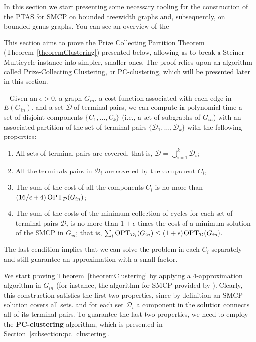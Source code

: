 In this section we start presenting some necessary tooling for the construction of the PTAS for SMCP on bounded treewidth graphs and, subsequently, on bounded genus graphs. You can see an overview of the 

This section aims to prove the Prize Collecting Partition Theorem (Theorem~\ref{theoremClustering}) presented below, allowing us to break a Steiner Multicycle instance into simpler, smaller ones. The proof relies upon an algorithm called Prize-Collecting Clustering, or PC-clustering, which will be presented later in this section.

\begin{ftheo}~\label{theoremClustering}
Given an \(\epsilon > 0\), a graph \(G_{in}\), a cost function associated with each edge in \(E(G_{in})\), and a set \(\mathcal{D}\) of terminal pairs, we can compute in polynomial time a set of disjoint components \(\{C_1, \dots, C_k\}\) (i.e., a set of subgraphs of \(G_{in}\)) with an associated partition of the set of terminal pairs \(\{\mathcal{D}_1, \dots, \mathcal{D}_k\}\) with the following properties:
\begin{enumerate}
    \item All sets of terminal pairs are covered, that is, \(\mathcal{D} = \bigcup_{i=1}^k \mathcal{D}_i\); \label{condition_t_clust:1}
    \item All the terminals pairs in \(\mathcal{D}_i\) are covered by the component \(C_i\); \label{condition_t_clust:2}
    \item The sum of the cost of all the components \(C_i\) is no more than \((16/\epsilon + 4) \operatorname{\textrm{OPT}}_{\mathcal{D}}(G_{in})\); \label{condition_t_clust:3}
    \item The sum of the costs of the minimum collection of cycles for each set of terminal pairs \(\mathcal{D}_i\) is no more than \(1 + \epsilon\) times the cost of a minimum solution of the SMCP in \(G_{in}\); that is, \(\sum_i \operatorname{\textrm{OPT}}_{\mathcal{D}_i} (G_{in}) \leq (1 + \epsilon) \operatorname{\textrm{OPT}}_{\mathcal{D}} (G_{in})\). \label{condition_t_clust:4}
\end{enumerate}
\end{ftheo}

The last condition implies that we can solve the problem in each \(C_i\) separately and still guarantee an approximation with a small factor.

We start proving Theorem~\ref{theoremClustering} by applying a 4-approximation algorithm in \(G_{in}\) (for instance, the algorithm for SMCP provided by \cite{Pereira2018TheSM}). Clearly, this construction satisfies the first two properties, since by definition an SMCP solution covers all sets, and for each set \(\mathcal{D}_i\) a component in the solution connects all of its terminal pairs. To guarantee the last two properties, we need to employ the \textbf{PC-clustering} algorithm, which is presented in Section~\ref{subsection:pc_clustering}.

